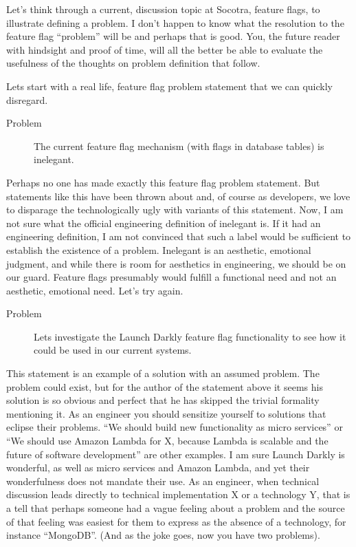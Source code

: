 Let's think through a current, discussion topic at Socotra, feature flags, to illustrate defining a problem. I don't happen to know what the
resolution to the feature flag ``problem'' will be and perhaps that is good. You, the future reader with hindsight and proof of time, will
all the better be able to evaluate the usefulness of the thoughts on problem definition that follow.

Lets start with a real life, feature flag problem statement that we can quickly disregard.
\begin{description}
\item[Problem] The current feature flag
mechanism (with flags in database tables) is inelegant.
\end{description}
Perhaps no one has made exactly this feature flag problem statement. But statements like this have been thrown about and, of course as
developers, we love to disparage the technologically ugly with variants of this statement. Now, I am not sure what the official engineering
definition of inelegant is. If it had an engineering definition, I am not convinced that such a label would be sufficient to establish the
existence of a problem. Inelegant is an aesthetic, emotional judgment, and while there is room for aesthetics in engineering, we should be
on our guard. Feature flags presumably would fulfill a functional need and not an aesthetic, emotional need. Let's try again.

\begin{description}
\item[Problem] Lets investigate the Launch Darkly feature flag functionality to see how it could be used in our current systems.
\end{description}
This statement is an example of a solution with an assumed problem. The problem could exist, but for the author of the statement above
it seems his solution is so obvious and perfect that he
has skipped the trivial formality mentioning it. As an engineer you should sensitize yourself to solutions that eclipse their problems.
``We should build new functionality as micro services'' or
``We should use Amazon Lambda for X, because Lambda is scalable and the future of software development'' are other examples. I am sure Launch Darkly is wonderful,
as well as micro services and Amazon Lambda, and yet their wonderfulness does not mandate their use. As an engineer, when technical discussion 
leads directly to technical implementation X or a technology Y, that is a tell that perhaps someone had a vague feeling about a
problem and the source of that feeling was easiest for them to express as the absence of a technology, for instance ``MongoDB''. (And as the joke goes, now
you have two problems).

